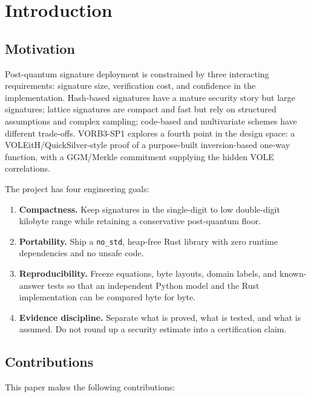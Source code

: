 \documentclass[11pt,a4paper]{article}
\begin{document}
\tableofcontents
\newpage

\section{Introduction}

\subsection{Motivation}

Post-quantum signature deployment is constrained by three interacting
requirements: signature size, verification cost, and confidence in the
implementation. Hash-based signatures have a mature security story but large
signatures; lattice signatures are compact and fast but rely on structured
assumptions and complex sampling; code-based and multivariate schemes have
different trade-offs. VORB3-SP1 explores a fourth point in the design space:
a VOLEitH/QuickSilver-style proof of a purpose-built inversion-based one-way
function, with a GGM/Merkle commitment supplying the hidden VOLE
correlations.

The project has four engineering goals:

\begin{enumerate}
  \item \textbf{Compactness.} Keep signatures in the single-digit to low
        double-digit kilobyte range while retaining a conservative
        post-quantum floor.
  \item \textbf{Portability.} Ship a \texttt{no\_std}, heap-free Rust library
        with zero runtime dependencies and no unsafe code.
  \item \textbf{Reproducibility.} Freeze equations, byte layouts, domain
        labels, and known-answer tests so that an independent Python model and
        the Rust implementation can be compared byte for byte.
  \item \textbf{Evidence discipline.} Separate what is proved, what is tested,
        and what is assumed. Do not round up a security estimate into a
        certification claim.
\end{enumerate}

\subsection{Contributions}

This paper makes the following contributions:
\end{document}
